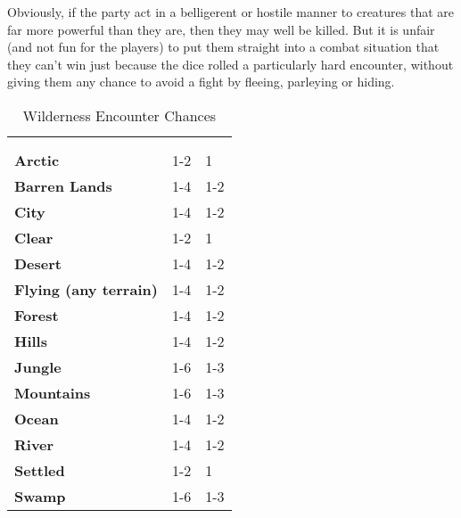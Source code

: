\begin{multicols*}{2}
Obviously, if the party act in a belligerent or hostile manner to creatures that are far more powerful than they are, then they may well be killed. But it is unfair (and not fun for the players) to put them straight into a combat situation that they can’t win just because the dice rolled a particularly hard encounter, without giving them any chance to avoid a fight by fleeing, parleying or hiding.

\begin {table}[H]
  \caption{Wilderness Encounter Chances}\label{tab:Wilderness Encounter Chances}
  \begin{tabularx}{\columnwidth}{>{\bfseries}YYY}
	\thead{} & \\
	 &  & \\
	Arctic & 1-2 & 1\\
	Barren Lands & 1-4 & 1-2\\
	City & 1-4 & 1-2\\
	Clear & 1-2 & 1\\
	Desert & 1-4 & 1-2\\
	Flying (any terrain) & 1-4 & 1-2\\
	Forest & 1-4 & 1-2\\
	Hills & 1-4 & 1-2\\
	Jungle & 1-6 & 1-3\\
	Mountains & 1-6 & 1-3\\
	Ocean & 1-4 & 1-2\\
	River & 1-4 & 1-2\\
	Settled & 1-2 & 1\\
	Swamp & 1-6 & 1-3
  \end {tabularx}
\end {table}

\end{multicols*}

